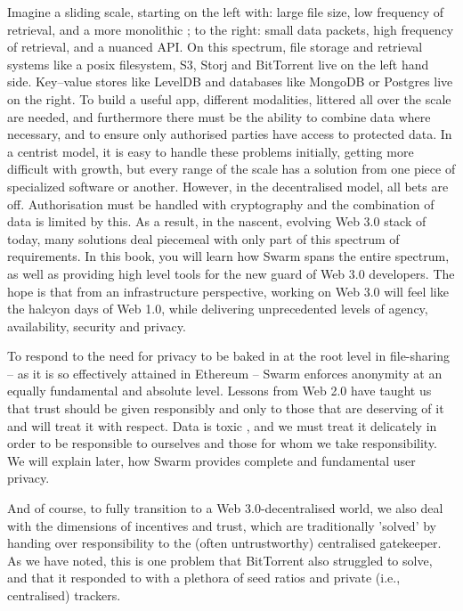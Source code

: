Imagine a sliding scale, starting on the left with: large file size, low frequency of retrieval, and a more monolithic ; to the right: small data packets, high frequency of retrieval, and a nuanced API. On this spectrum, file storage and retrieval systems like a posix filesystem, S3, Storj and BitTorrent live on the left hand side. Key--value stores like LevelDB and databases like MongoDB or Postgres live on the right. To build a useful app, different modalities, littered all over the scale are needed, and furthermore there must be the ability to combine data where necessary, and to ensure only authorised parties have access to protected data. In a centrist model, it is easy to handle these problems initially, getting more difficult with growth, but every range of the scale has a solution from one piece of specialized software or another. However, in the decentralised model, all bets are off. Authorisation must be handled with cryptography and the combination of data is limited by this. As a result, in the nascent, evolving Web 3.0 stack of today, many solutions deal piecemeal with only part of this spectrum of requirements. In this book, you will learn how Swarm spans the entire spectrum, as well as providing high level tools for the new guard of Web 3.0 developers. The hope is that from an infrastructure perspective, working on Web 3.0 will feel like the halcyon days of Web 1.0, while delivering unprecedented levels of agency, availability, security and privacy.

To respond to the need for privacy to be baked in at the root level in file-sharing – as it is so effectively attained in Ethereum – Swarm enforces anonymity at an equally fundamental and absolute level. Lessons from Web 2.0 have taught us that trust should be given responsibly and only to those that are deserving of it and will treat it with respect. Data is toxic \cite{schneier2019Jul}, and we must treat it delicately in order to be responsible to ourselves and those for whom we take responsibility. We will explain later, how Swarm provides complete and fundamental user privacy.

And of course, to fully transition to a Web 3.0-decentralised world, we also deal with the dimensions of incentives and trust, which are traditionally 'solved' by handing over responsibility to the (often untrustworthy) centralised gatekeeper. As we have noted, this is one problem that BitTorrent also struggled to solve, and that it responded to with a plethora of seed ratios and private (i.e., centralised) trackers.

